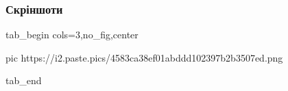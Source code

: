  
 
 
 
 

\subsubsection{Скріншоти}

\ifcmt
  tab_begin cols=3,no_fig,center

     pic https://i2.paste.pics/4583ca38ef01abddd102397b2b3507ed.png

  tab_end
\fi

